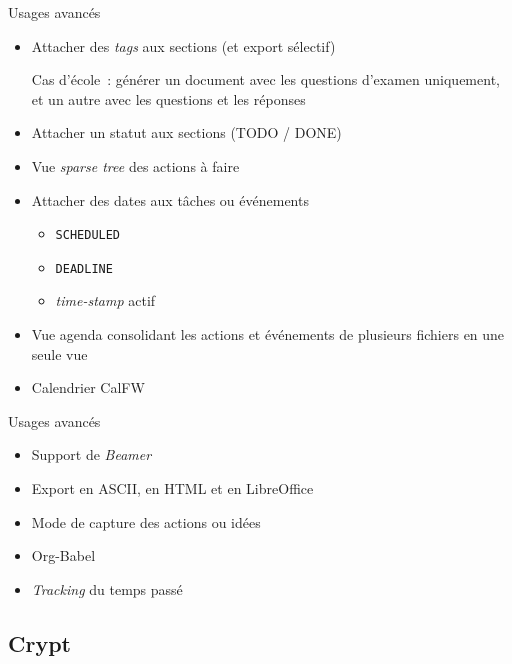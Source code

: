 \documentclass[presentation,t,hideothersubsections]{beamer}
\begin{document}
\begin{frame}[fragile,label=sec-5-1-1]{Usages avancés}
 \begin{itemize}
\item Attacher des \emph{tags} aux sections (et export sélectif)

Cas d'école~: générer un document avec les questions d'examen uniquement, et
un autre avec les questions et les réponses

\item Attacher un statut aux sections (TODO / DONE)

\item Vue \emph{sparse tree} des actions à faire

\item Attacher des dates aux tâches ou événements
\begin{itemize}
\item \texttt{SCHEDULED}
\item \texttt{DEADLINE}
\item \emph{time-stamp} actif
\end{itemize}

\item Vue agenda consolidant les actions et événements de plusieurs fichiers en
une seule vue

\item Calendrier CalFW
\end{itemize}
\end{frame}
\begin{frame}[label=sec-5-1-2]{Usages avancés}
\begin{itemize}
\item Support de \emph{Beamer}

\item Export en ASCII, en HTML et en LibreOffice

\item Mode de capture des actions ou idées

\item Org-Babel

\item \emph{Tracking} du temps passé
\end{itemize}
\end{frame}
\subsection{Crypt}
\label{sec-5-2}
\end{document}
